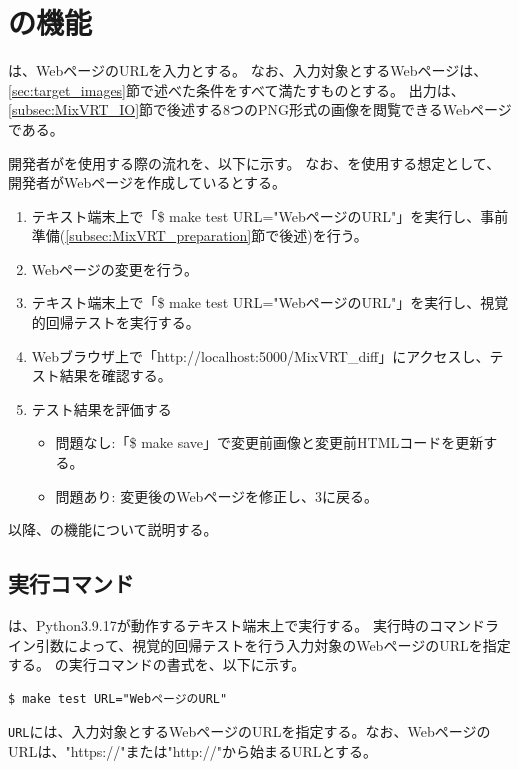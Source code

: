 \section{\toolName の機能}
\toolName は、WebページのURLを入力とする。
なお、入力対象とするWebページは、\ref{sec:target_images}節で述べた条件をすべて満たすものとする。
出力は、\ref{subsec:MixVRT_IO}節で後述する8つのPNG形式の画像を閲覧できるWebページである。
\par
開発者が\toolName を使用する際の流れを、以下に示す。
なお、\toolName を使用する想定として、開発者がWebページを作成しているとする。
\begin{enumerate}
    \item テキスト端末上で「\$ make test URL="WebページのURL"」を実行し、事前準備(\ref{subsec:MixVRT_preparation}節で後述)を行う。
    \item Webページの変更を行う。
    \item テキスト端末上で「\$ make test URL="WebページのURL"」を実行し、視覚的回帰テストを実行する。
    \item Webブラウザ上で「http://localhost:5000/MixVRT\_diff」にアクセスし、テスト結果を確認する。
    \item テスト結果を評価する
          \begin{itemize}
              \item 問題なし:「\$ make save」で変更前画像と変更前HTMLコードを更新する。
              \item 問題あり: 変更後のWebページを修正し、3に戻る。
          \end{itemize}
\end{enumerate}
以降、\toolName の機能について説明する。

\subsection{実行コマンド}\label{subsec:MixVRT_execution}
\toolName は、Python3.9.17\cite{Python}が動作するテキスト端末上で実行する。
\toolName 実行時のコマンドライン引数によって、視覚的回帰テストを行う入力対象のWebページのURLを指定する。
\toolName の実行コマンドの書式を、以下に示す。
\begin{lstlisting}[label=list:command,frame=none,numbers=none,basicstyle={\normalsize \ttfamily \color[gray]{.15}}]
  $ make test URL="WebページのURL"
 \end{lstlisting}
{\tt URL}には、入力対象とするWebページのURLを指定する。なお、WebページのURLは、"https://"または"http://"から始まるURLとする。

